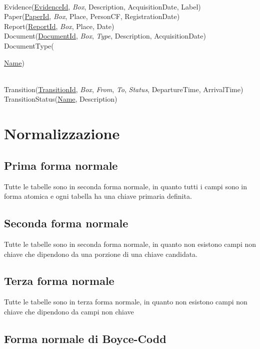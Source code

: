 \documentclass{article}
\begin{document}
\noindent \\
Evidence(\underline{EvidenceId}, \textit{Box}, Description, AcquisitionDate, Label) \\
Paper(\underline{PaperId}, \textit{Box}, Place, PersonCF, RegistrationDate) \\
Report(\underline{ReportId}, \textit{Box}, Place, Date) \\
Document(\underline{DocumentId}, \textit{Box}, \textit{Type}, Description, AcquisitionDate) \\
DocumentType({\underline{Name})

\noindent \\
Transition(\underline{TransitionId}, \textit{Box}, \textit{From}, \textit{To}, \textit{Status}, DepartureTime, ArrivalTime) \\
TransitionStatus(\underline{Name}, Description)

\section{Normalizzazione}

\subsection{Prima forma normale}

Tutte le tabelle sono in seconda forma normale, in quanto tutti i campi sono in forma atomica e
ogni tabella ha una chiave primaria definita.

\subsection{Seconda forma normale}

Tutte le tabelle sono in seconda forma normale, in quanto non esistono campi non chiave
che dipendono da una porzione di una chiave candidata.

\subsection{Terza forma normale}

Tutte le tabelle sono in terza forma normale, in quanto non esistono campi non chiave
che dipendono da campi non chiave

\subsection{Forma normale di Boyce-Codd}

}
\end{document}

